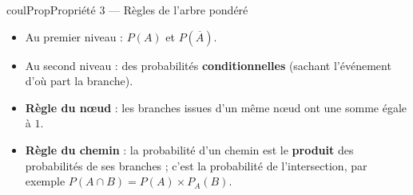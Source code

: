 \documentclass[11pt,a4paper]{article}
\makeatletter
\newcounter{lycee@signet}
\newcommand{\signet}[3][]{\stepcounter{lycee@signet}%
  \edef\lycee@dest{\if\relax\detokenize{#1}\relax
    signet.\arabic{lycee@signet}\else#1\fi}%
  \hypertarget{\lycee@dest}{}\bookmark[level=#2,dest=\lycee@dest]{#3}}
\newenvironment{proprietebox}[1][Propriété]%
  {\begin{boitecours}[phantom={\signet{2}{#1}}]{coulProp}{#1}}{\end{boitecours}}
\makeatother
\begin{document}
\begin{proprietebox}[Propriété 3 --- Règles de l'arbre pondéré]
\begin{minipage}[c]{0.44\linewidth}\raggedright
\begin{itemize}
  \item Au premier niveau : $P(A)$ et $P(\overline{A})$.
  \item Au second niveau : des probabilités \textbf{conditionnelles} (sachant
    l'événement d'où part la branche).
  \item \textbf{Règle du nœud} : les branches issues d'un même nœud ont une somme
    égale à $1$.
  \item \textbf{Règle du chemin} : la probabilité d'un chemin est le
    \textbf{produit} des probabilités de ses branches ; c'est la probabilité de
    l'intersection, par exemple $P(A\cap B)=P(A)\times P_{A}(B)$.
\end{itemize}
\end{minipage}\hfill
\begin{minipage}[c]{0.54\linewidth}\centering
{}
\end{minipage}
\end{proprietebox}
\end{document}
